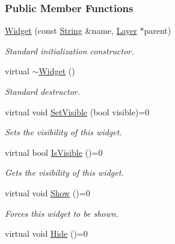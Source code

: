 \subsubsection*{Public Member Functions}
\begin{DoxyCompactItemize}
\item 
\hyperlink{classphys_1_1UI_1_1Widget_a7f992cc7513f1e41795b3569aa8faced}{Widget} (const \hyperlink{namespacephys_aa03900411993de7fbfec4789bc1d392e}{String} \&name, \hyperlink{classphys_1_1UI_1_1Layer}{Layer} $\ast$parent)
\begin{DoxyCompactList}\small\item\em Standard initialization constructor. \item\end{DoxyCompactList}\item 
\hypertarget{classphys_1_1UI_1_1Widget_a95bde61e93544334b376938274617d15}{
virtual \hyperlink{classphys_1_1UI_1_1Widget_a95bde61e93544334b376938274617d15}{$\sim$Widget} ()}
\label{d9/d48/classphys_1_1UI_1_1Widget_a95bde61e93544334b376938274617d15}

\begin{DoxyCompactList}\small\item\em Standard destructor. \item\end{DoxyCompactList}\item 
virtual void \hyperlink{classphys_1_1UI_1_1Widget_ab049233d8d5522a6ab42654b8924a3e0}{SetVisible} (bool visible)=0
\begin{DoxyCompactList}\small\item\em Sets the visibility of this widget. \item\end{DoxyCompactList}\item 
virtual bool \hyperlink{classphys_1_1UI_1_1Widget_aaf1a1bd31b8e626467ce9cdb69bdf7ac}{IsVisible} ()=0
\begin{DoxyCompactList}\small\item\em Gets the visibility of this widget. \item\end{DoxyCompactList}\item 
\hypertarget{classphys_1_1UI_1_1Widget_aa53e64903afc4a1fecd066c814b6c8d4}{
virtual void \hyperlink{classphys_1_1UI_1_1Widget_aa53e64903afc4a1fecd066c814b6c8d4}{Show} ()=0}
\label{d9/d48/classphys_1_1UI_1_1Widget_aa53e64903afc4a1fecd066c814b6c8d4}

\begin{DoxyCompactList}\small\item\em Forces this widget to be shown. \item\end{DoxyCompactList}\item 
\hypertarget{classphys_1_1UI_1_1Widget_abc8e3f88f780e3b36b38086c45311795}{
virtual void \hyperlink{classphys_1_1UI_1_1Widget_abc8e3f88f780e3b36b38086c45311795}{Hide} ()=0}
\label{d9/d48/classphys_1_1UI_1_1Widget_abc8e3f88f780e3b36b38086c45311795}


\end{DoxyCompactItemize}
